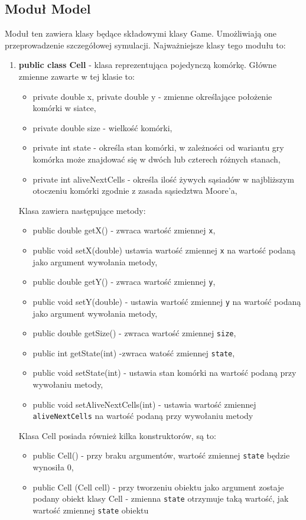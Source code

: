 \documentclass[10pt, oneside]{article}
\begin{document}
\subsection{Moduł Model}
Moduł ten zawiera klasy będące składowymi klasy Game. Umożliwiają one przeprowadzenie szczegółowej symulacji. Najważniejsze klasy tego modułu to:
\begin {enumerate}
\item  \textbf{ public class Cell} - klasa reprezentująca pojedynczą komórkę. Główne zmienne zawarte w tej klasie to:
	\begin{itemize}
		\item private double x, private double y - zmienne określające położenie komórki w siatce,
		\item private double size -  wielkość komórki,
		\item private int state -  określa stan komórki, w zależności od wariantu gry komórka może znajdować się w dwóch lub czterech różnych stanach,
		\item private int aliveNextCells - określa ilość żywych sąsiadów w najbliższym otoczeniu komórki zgodnie z zasada sąsiedztwa Moore'a,
	\end{itemize}
	
	Klasa zawiera następujące metody:
	\begin{itemize}
	\item public double getX() - zwraca wartość zmiennej \texttt{x},
	\item public void setX(double)  ustawia wartość zmiennej \texttt {x} na wartość podaną jako argument wywołania metody,
	\item public double getY() - zwraca wartość zmiennej \texttt{y},
	\item  public void setY(double) - ustawia wartość zmiennej \texttt{y}  na wartość podaną jako argument wywołania metody,
	\item  public double getSize() - zwraca wartość zmiennej \texttt{size},
	\item public int getState(int) -zwraca watość zmiennej \texttt{state},
	\item public void setState(int) - ustawia stan komórki na wartość podaną przy wywołaniu metody,
	\item public void setAliveNextCells(int) - ustawia wartość zmiennej \texttt {aliveNextCells} na wartość podaną przy wywołaniu metody
	\end{itemize}

	Klasa Cell posiada również kilka konstruktorów, są to:
	\begin{itemize}
	\item public Cell() - przy braku argumentów, wartość zmiennej \texttt{state} będzie wynosiła 0,
	\item public Cell (Cell cell) - przy tworzeniu obiektu jako argument zostaje podany obiekt klasy Cell - zmienna \texttt{state} otrzymuje taką wartość, jak wartość zmiennej \texttt {state} obiektu 
	\end{itemize}



\end{enumerate}
\end{document}
